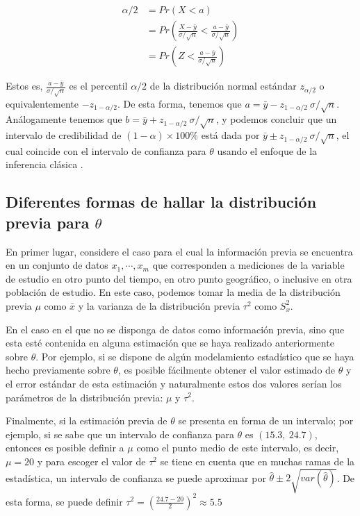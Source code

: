 \documentclass[
  10pt,
  spanish,
]{book}
\theoremstyle{definition}
\theoremstyle{definition}
\theoremstyle{definition}
\theoremstyle{definition}
\theoremstyle{remark}
\begin{document}
\begin{align*}
\alpha/2&=Pr(X<a)\\
&=Pr(\frac{X-\bar{y}}{\sigma/\sqrt{n}}<\frac{a-\bar{y}}{\sigma/\sqrt{n}})\\
&=Pr(Z < \frac{a-\bar{y}}{\sigma/\sqrt{n}})
\end{align*}

Estos es, \(\frac{a-\bar{y}}{\sigma/\sqrt{n}}\) es el percentil \(\alpha/2\) de la distribución normal estándar \(z_{\alpha/2}\) o equivalentemente \(-z_{1-\alpha/2}\). De esta forma, tenemos que \(a=\bar{y}-z_{1-\alpha/2}\ \sigma/\sqrt{n}\). Análogamente tenemos que \(b=\bar{y}+z_{1-\alpha/2}\ \sigma/\sqrt{n}\), y podemos concluir que un intervalo de credibilidad de \((1-\alpha)\times 100\%\) está dada por \(\bar{y}\pm z_{1-\alpha/2}\ \sigma/\sqrt{n}\), el cual coincide con el intervalo de confianza para \(\theta\) usando el enfoque de la inferencia clásica \citep{Zhang}.

\hypertarget{diferentes-formas-de-hallar-la-distribuciuxf3n-previa-para-theta}{%
\subsection{\texorpdfstring{Diferentes formas de hallar la distribución previa para \(\theta\)}{Diferentes formas de hallar la distribución previa para \textbackslash theta}}\label{diferentes-formas-de-hallar-la-distribuciuxf3n-previa-para-theta}}

En primer lugar, considere el caso para el cual la información previa se encuentra en un conjunto de datos \(x_1,\cdots,x_{m}\) que corresponden a mediciones de la variable de estudio en otro punto del tiempo, en otro punto geográfico, o inclusive en otra población de estudio. En este caso, podemos tomar la media de la distribución previa \(\mu\) como \(\bar{x}\) y la varianza de la distribución previa \(\tau^2\) como \(S^2_x\).

En el caso en el que no se disponga de datos como información previa, sino que esta esté contenida en alguna estimación que se haya realizado anteriormente sobre \(\theta\). Por ejemplo, si se dispone de algún modelamiento estadístico que se haya hecho previamente sobre \(\theta\), es posible fácilmente obtener el valor estimado de \(\theta\) y el error estándar de esta estimación y naturalmente estos dos valores serían los parámetros de la distribución previa: \(\mu\) y \(\tau^2\).

Finalmente, si la estimación previa de \(\theta\) se presenta en forma de un intervalo; por ejemplo, si se sabe que un intervalo de confianza para \(\theta\) es \((15.3,\ 24.7)\), entonces es posible definir a \(\mu\) como el punto medio de este intervalo, es decir, \(\mu=20\) y para escoger el valor de \(\tau^2\) se tiene en cuenta que en muchas ramas de la estadística, un intervalo de confianza se puede aproximar por \(\hat{\theta}\pm 2\sqrt{var(\hat{\theta})}\). De esta forma, se puede definir \(\tau^2=\left(\frac{24.7-20}{2}\right)^2\approx5.5\)
\end{document}
